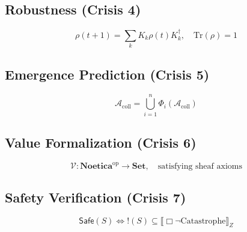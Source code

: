 \documentclass[11pt,twoside]{article}
\theoremstyle{definition}
\theoremstyle{plain}
\theoremstyle{remark}
\newcommand{\sem}[1]{\llbracket #1 \rrbracket}
\newcommand{\Noetica}{\mathbf{Noetica}}
\newcommand{\Frac}{\Phi}
\newcommand{\DensityMat}{\rho}
\newcommand{\Trace}{\mathrm{Tr}}
\begin{document}
\subsection*{Robustness (Crisis 4)}
\begin{equation}
\DensityMat(t+1) = \sum_k K_k \DensityMat(t) K_k^\dagger, \quad \Trace(\DensityMat) = 1
\tag{Robustness}
\end{equation}

\subsection*{Emergence Prediction (Crisis 5)}
\begin{equation}
\mathcal{A}_{\mathrm{coll}} = \bigcup_{i=1}^{n} \Frac_i(\mathcal{A}_{\mathrm{coll}})
\tag{Emergence}
\end{equation}

\subsection*{Value Formalization (Crisis 6)}
\begin{equation}
\mathcal{V} : \Noetica^{\mathrm{op}} \to \mathbf{Set}, \quad \text{satisfying sheaf axioms}
\tag{Values}
\end{equation}

\subsection*{Safety Verification (Crisis 7)}
\begin{equation}
\mathsf{Safe}(S) \iff !(S) \subseteq \sem{\Box \neg \mathrm{Catastrophe}}_Z
\tag{Safety}
\end{equation}
\end{document}

